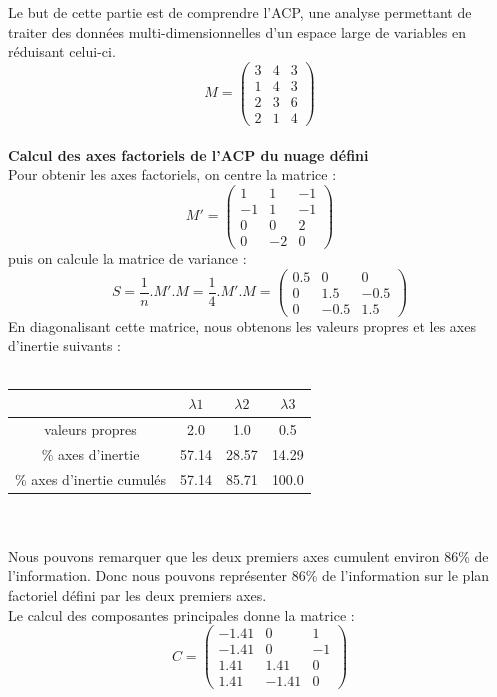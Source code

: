 \documentclass[a4paper, 10pt]{article}
\begin{document}
Le but de cette partie est de comprendre l'ACP, une analyse permettant de traiter des donn\'ees multi-dimensionnelles d'un espace
large de variables en r\'eduisant celui-ci.
\[M =
\begin{pmatrix}
3 & 4 & 3\\
1 & 4 & 3\\
2 & 3 & 6\\
2 & 1 & 4
\end{pmatrix}\]\\
\textbf{Calcul des axes factoriels de l'ACP du nuage d\'efini}\\
Pour obtenir les axes factoriels, on centre la matrice :
\[M' =
\begin{pmatrix}
1 & 1 & -1\\
-1 & 1 & -1\\
0 & 0 & 2\\
0 & -2 & 0
\end{pmatrix}\]
puis on calcule la matrice de variance :
\[S = \frac{1}{n}.M'.M = \frac{1}{4}.M'.M =
\begin{pmatrix}
0.5 & 0 & 0\\
0 & 1.5 & -0.5\\
0 & -0.5 & 1.5
\end{pmatrix}\]
En diagonalisant cette matrice, nous obtenons les valeurs propres et les axes d'inertie suivants :\\ \\
\begin{tabular}{|c|c|c|c|}
\hline
 & $\lambda1$ & $\lambda2$ & $\lambda3$\\
\hline
valeurs propres & 2.0 & 1.0 & 0.5\\
\hline
\% axes d'inertie & 57.14 & 28.57 & 14.29\\
\hline
\% axes d'inertie cumul\'es & 57.14 & 85.71 & 100.0\\
\hline
\end{tabular}\\ \\
Nous pouvons remarquer que les deux premiers axes cumulent environ 86\% de l'information.
Donc nous pouvons repr\'esenter 86\% de l'information sur le plan factoriel d\'efini par les deux premiers axes.\\
Le calcul des composantes principales donne la matrice :\\
\[C =
\begin{pmatrix}
-1.41 & 0 & 1\\
-1.41 & 0 & -1\\
1.41 & 1.41 & 0\\
1.41 & -1.41 & 0
\end{pmatrix}\]
\end{document}
